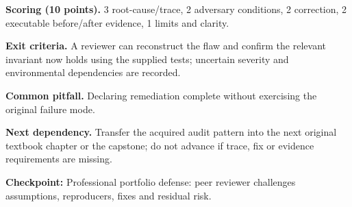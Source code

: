 \documentclass[10pt,letterpaper]{article}
\begin{document}
\textbf{Scoring (10 points).} 3 root-cause/trace, 2 adversary conditions, 2 correction, 2 executable before/after evidence, 1 limits and clarity.

\textbf{Exit criteria.} A reviewer can reconstruct the flaw and confirm the relevant invariant now holds using the supplied tests; uncertain severity and environmental dependencies are recorded.

\textbf{Common pitfall.} Declaring remediation complete without exercising the original failure mode.

\textbf{Next dependency.} Transfer the acquired audit pattern into the next original textbook chapter or the capstone; do not advance if trace, fix or evidence requirements are missing.

\begin{historynote}\textbf{Checkpoint:} Professional portfolio defense: peer reviewer challenges assumptions, reproducers, fixes and residual risk.\end{historynote}
\end{document}
